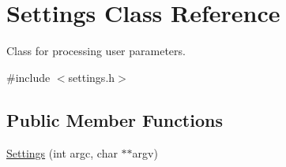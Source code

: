 \hypertarget{class_settings}{}\section{Settings Class Reference}
\label{class_settings}


Class for processing user parameters.  




{\ttfamily \#include $<$settings.\+h$>$}

\subsection*{Public Member Functions}
\begin{DoxyCompactItemize}
\item 
\hyperlink{class_settings_a1dc49e08c9e740e0ccab6fa2f54537bd}{Settings} (int argc, char $\ast$$\ast$argv)
\end{DoxyCompactItemize}
